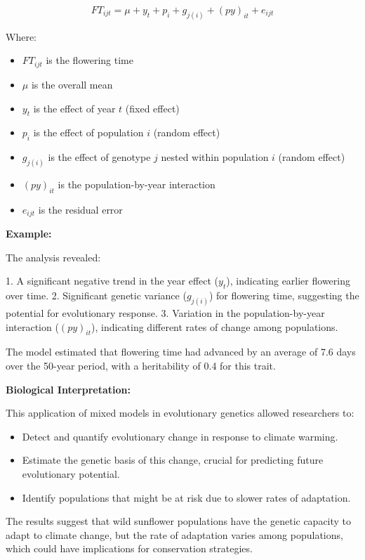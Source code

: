 \documentclass[12pt,a4paper]{article}
\newenvironment{example}[1][]
{\begin{basebox}[linecolor=uqgold]
\textbf{\color{uqgold}Example:} \textit{#1}\par\noindent\ignorespaces}
{\end{basebox}}
\newenvironment{interpretation}[1][]
{\begin{basebox}[linecolor=uqgreen]
\textbf{\color{uqgreen}Biological Interpretation:} \textit{#1}\par\noindent\ignorespaces}
{\end{basebox}}
\begin{document}
\[
FT_{ijt} = \mu + y_t + p_i + g_{j(i)} + (py)_{it} + e_{ijt}
\]

Where:
\begin{itemize}
    \item $FT_{ijt}$ is the flowering time
    \item $\mu$ is the overall mean
    \item $y_t$ is the effect of year $t$ (fixed effect)
    \item $p_i$ is the effect of population $i$ (random effect)
    \item $g_{j(i)}$ is the effect of genotype $j$ nested within population $i$ (random effect)
    \item $(py)_{it}$ is the population-by-year interaction
    \item $e_{ijt}$ is the residual error
\end{itemize}

\begin{example}
The analysis revealed:

1. A significant negative trend in the year effect ($y_t$), indicating earlier flowering over time.
2. Significant genetic variance ($g_{j(i)}$) for flowering time, suggesting the potential for evolutionary response.
3. Variation in the population-by-year interaction ($(py)_{it}$), indicating different rates of change among populations.

The model estimated that flowering time had advanced by an average of 7.6 days over the 50-year period, with a heritability of 0.4 for this trait.
\end{example}

\begin{interpretation}
This application of mixed models in evolutionary genetics allowed researchers to:
\begin{itemize}
    \item Detect and quantify evolutionary change in response to climate warming.
    \item Estimate the genetic basis of this change, crucial for predicting future evolutionary potential.
    \item Identify populations that might be at risk due to slower rates of adaptation.
\end{itemize}
The results suggest that wild sunflower populations have the genetic capacity to adapt to climate change, but the rate of adaptation varies among populations, which could have implications for conservation strategies.
\end{interpretation}
\end{document}
